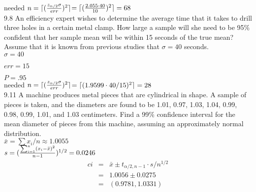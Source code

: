 needed $n = \lceil (\frac{z_{\alpha/2} \sigma}{err})^2 \rceil$$= \lceil(\frac{2.055 \cdot 40}{10})^2\rceil = 68$ \\


9.8 An efficiency expert wishes to determine the average time that it takes to drill three holes in a certain metal clamp. How large a sample will she need to be 95\% confident that her sample mean will be within 15 seconds of the true mean? Assume that it is known from previous studies that $\sigma = 40$ seconds. \\


$\sigma = 40$

$err = 15$

$P = .95$ \\


needed $n = \lceil (\frac{z_{\alpha/2} \sigma}{err})^2 \rceil$$= \lceil(1.9599 \cdot 40/15)^2\rceil = 28$ \\


9.11 A machine produces metal pieces that are cylindrical in shape. A sample of pieces is taken, and the diameters are found to be 1.01, 0.97, 1.03, 1.04, 0.99, 0.98, 0.99, 1.01, and 1.03 centimeters. Find a 99\% confidence interval for the mean diameter of pieces from this machine, assuming an approximately normal distribution. \\

$\bar{x} = \sum x_i /n \approx 1.0055 $ \\


$s = (\frac{\sum_{i=1}^n(x_i - \bar{x})^2}{n-1})^{1/2} = 0.0246$ \\

\begin{eqnarray*}
ci & =& \bar{x} \pm t_{\alpha/2, n-1} \cdot s/n^{1/2}  \\
& = & 1.0056 \pm 0.0275  \\
& = & (0.9781, 1.0331) 
\end{eqnarray*}




